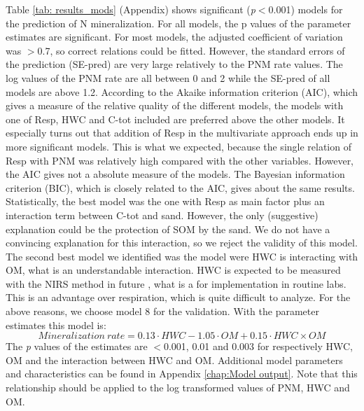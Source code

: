 \documentclass[10pt,twoside,dutch,english]{report}
\begin{document}
Table \ref{tab: results_mods} (Appendix) shows significant (\textit{p}$<$0.001) models for the prediction of N mineralization. For all models, the p values of the parameter estimates are significant. For most models, the adjusted coefficient of variation was $>$0.7, so correct relations could be fitted. However, the standard errors of the prediction (SE-pred) are very large relatively to the PNM rate values. The log values of the PNM rate are all between 0 and 2 while the SE-pred of all models are above 1.2.   According to the Akaike information criterion (AIC), which gives a measure of the relative quality of the different models, the models with one of Resp, HWC and C-tot included are preferred above the other models.  It especially turns out that addition of Resp in the multivariate approach ends up in more significant models. This is what we expected, because the single relation of Resp with PNM was relatively high compared with the other variables. However, the AIC gives not a absolute measure of the models. The Bayesian information criterion (BIC), which is closely related to the AIC, gives about the same results. 
Statistically, the best model was the one with Resp as main factor plus an interaction term between C-tot and sand. However, the only (suggestive) explanation could be the protection of SOM by the sand.  We do not have a convincing explanation for this interaction, so we reject the validity of this model. 
 The second best model we identified was the model were HWC is interacting with OM, what is an understandable interaction.  HWC is expected to be measured with the NIRS method in future \citep{Vasques2009}, what is a for implementation in routine labs. This is an advantage over respiration, which is quite difficult to analyze. For the above reasons, we choose model 8 for the validation. With the parameter estimates this model is: 
\begin{equation} %
Mineralization\  rate = 0.13\cdot HWC -1.05\cdot OM +0.15\cdot HWC\times OM
\label{eq: model}
\end{equation}The \textit{p} values of the estimates are $<$0.001, 0.01 and 0.003 for respectively HWC, OM and the interaction between HWC and OM. 
Additional model parameters and characteristics can be found in Appendix \ref{chap:Model output}. Note that this relationship should be applied to the log transformed values of PNM, HWC and OM. 
\end{document}

